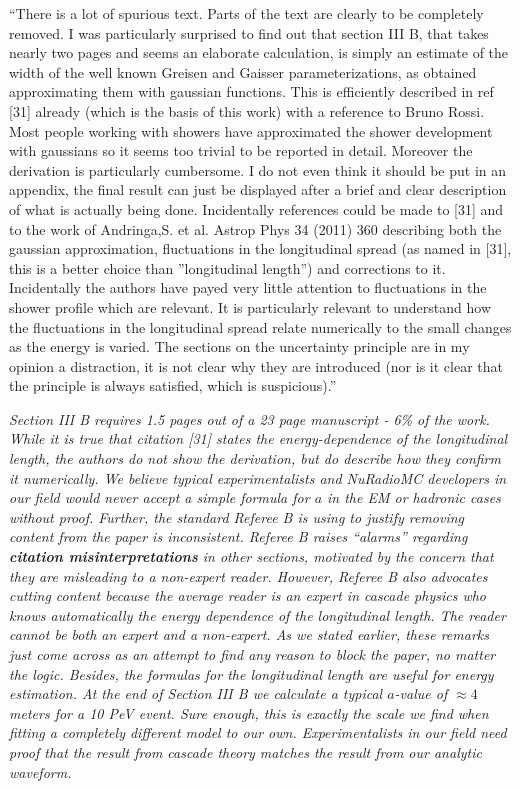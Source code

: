 \documentclass[12pt]{article}
\begin{document}
``There is a lot of spurious text. Parts of the text are clearly to be completely removed. I was particularly surprised to find out that section III B, that takes nearly two pages and seems an elaborate calculation, is simply an estimate of the width of the well known Greisen and Gaisser parameterizations, as obtained approximating them with gaussian functions. This is efficiently described in ref [31] already (which is the basis of this work) with a reference to Bruno Rossi. Most people working with showers have approximated the shower development with gaussians so it seems too trivial to be reported in detail. Moreover the derivation is particularly cumbersome. I do not even think it should be put in an appendix, the final result can just be displayed after a brief and clear description of what is actually being done. Incidentally references could be made to [31] and to the work of Andringa,S. et al. Astrop Phys 34 (2011) 360 describing both the gaussian approximation, fluctuations in the longitudinal spread (as named in [31], this is a better choice than ''longitudinal length'') and corrections to it. Incidentally the authors have payed very little attention to fluctuations in the shower profile which are relevant. It is particularly relevant to understand how the fluctuations in the longitudinal spread relate numerically to the small changes as the energy is varied. The sections on the uncertainty principle are in my opinion a distraction, it is not clear why they are introduced (nor is it clear that the principle is always satisfied, which is suspicious).''

\textit{Section III B requires 1.5 pages out of a 23 page manuscript - 6\% of the work.  While it is true that citation [31] states the energy-dependence of the longitudinal length, the authors do not show the derivation, but do describe how they confirm it numerically.  We believe typical experimentalists and NuRadioMC developers in our field would never accept a simple formula for $a$ in the EM or hadronic cases without proof.  Further, the standard Referee B is using to justify removing content from the paper is inconsistent.  Referee B raises ``alarms'' regarding \textbf{citation misinterpretations} in other sections, motivated by the concern that they are misleading to a non-expert reader.  However, Referee B also advocates cutting content because the average reader is an expert in cascade physics who knows automatically the energy dependence of the longitudinal length.  The reader cannot be both an expert and a non-expert.  As we stated earlier, these remarks just come across as an attempt to find any reason to block the paper, no matter the logic.  Besides, the formulas for the longitudinal length are useful for energy estimation.  At the end of Section III B we calculate a typical $a$-value of $\approx 4$ meters for a 10 PeV event.  Sure enough, this is exactly the scale we find when fitting a completely different model to our own.  Experimentalists in our field need proof that the result from cascade theory matches the result from our analytic waveform.}
\end{document}
